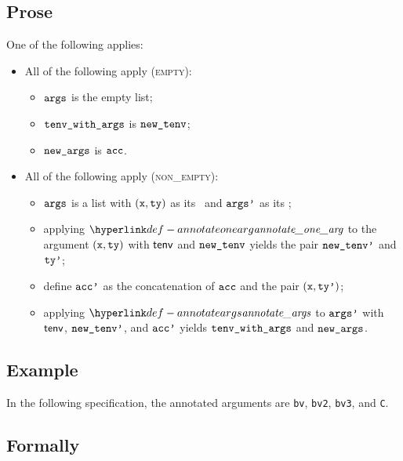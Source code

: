 \subsection{Prose}
One of the following applies:
\begin{itemize}
  \item All of the following apply (\textsc{empty}):
  \begin{itemize}
    \item $\texttt{args}$ is the empty list;
    \item $\texttt{tenv\_with\_args}$ is $\texttt{new\_tenv}$;
    \item $\texttt{new\_args}$ is $\texttt{acc}$.
  \end{itemize}

  \item All of the following apply (\textsc{non\_empty}):
  \begin{itemize}
    \item $\texttt{args}$ is a list with $(\texttt{x}, \texttt{ty})$ as its \head\ and $\texttt{args'}$ as its \tail;
    \item applying $\annotateonearg$ to the argument $(\texttt{x}, \texttt{ty})$ with $\textsf{tenv}$ and $\texttt{new\_tenv}$ yields the pair $\texttt{new\_tenv'}$ and $\texttt{ty'}$\ProseOrTypeError;
    \item define $\texttt{acc'}$ as the concatenation of $\texttt{acc}$ and the pair $(\texttt{x}, \texttt{ty'})$;
    \item applying $\annotateargs$ to $\texttt{args'}$ with $\textsf{tenv}$, $\texttt{new\_tenv'}$, and $\texttt{acc'}$ yields $\texttt{tenv\_with\_args}$ and $\texttt{new\_args}$.
  \end{itemize}
\end{itemize}

\subsection{Example}
In the following specification, the annotated arguments are
\texttt{bv}, \texttt{bv2}, \texttt{bv3}, and \texttt{C}.


\subsection{Formally}

